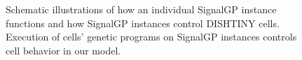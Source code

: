 \begin{figure}
\begin{center}
\caption{
Schematic illustrations of how an individual SignalGP instance functions and how SignalGP instances control DISHTINY cells.
Execution of cells' genetic programs on SignalGP instances controls cell behavior in our model.
}
\label{fig:signalgp-dishtinygp}
\end{center}
\end{figure}
